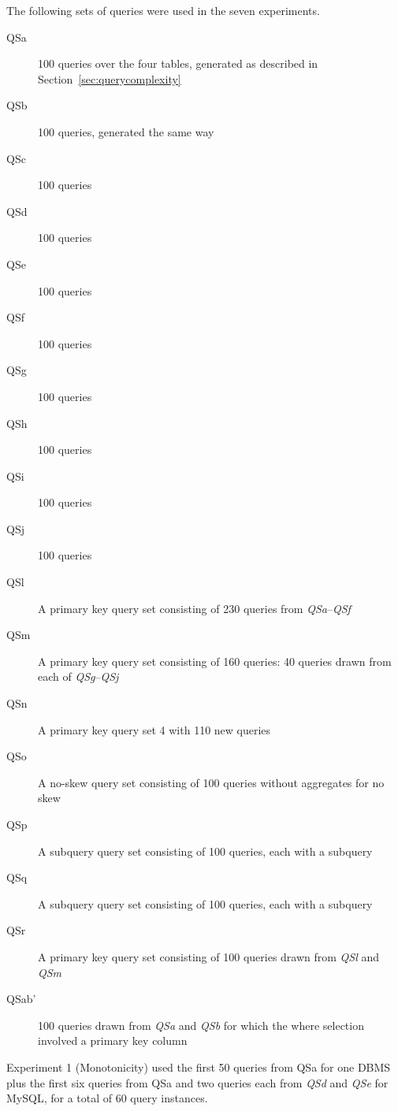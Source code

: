 \documentclass[prodmode,acmtods]{acmsmall}
\begin{document}
The following sets of queries were used in the seven experiments.

\begin{description}
\item[QSa] 100 queries over the four tables, generated as described in Section~\ref{sec:querycomplexity}
\item[QSb] 100 queries, generated the same way
\item[QSc] 100 queries
\item[QSd] 100 queries
\item[QSe] 100 queries
\item[QSf] 100 queries
\item[QSg] 100 queries
\item[QSh] 100 queries
\item[QSi] 100 queries
\item[QSj] 100 queries
\item[QSl] A primary key query set consisting of 230 queries from {\em
  QSa}--{\em QSf}
\item[QSm] A primary key query set consisting of 160 queries: 40 queries
  drawn from each of {\em QSg}--{\em QSj}
\item[QSn] A primary key query set 4 with 110 new queries
\item[QSo] A no-skew query set consisting of 100 queries without aggregates for no skew
\item[QSp] A subquery query set consisting of 100 queries, each with a subquery
\item[QSq] A subquery query set consisting of 100 queries, each with a subquery
\item[QSr] A primary key query set consisting of 100 queries drawn from {\em
  QSl} and {\em QSm}
\item[QSab'] 100 queries drawn from {\em QSa} and {\em QSb} for which the where
     selection involved a primary key column
\end{description}


Experiment 1 (Monotonicity) used the first 50 queries from QSa
for one DBMS plus the first six queries from QSa and two queries each from
{\em QSd} and {\em QSe} for MySQL, for a total of 60 query instances.
\end{document}
